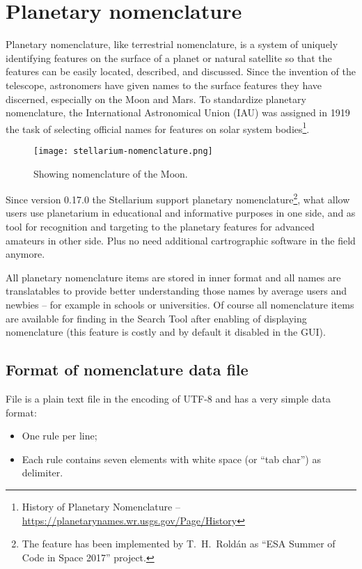 
\chapter{Planetary nomenclature}
\label{ch:Nomenclature}

 Planetary nomenclature, like terrestrial nomenclature, is a system of uniquely identifying features on the surface of a planet or natural satellite so that the features can be easily located, described, and discussed. Since the invention of the telescope, astronomers have given names to the surface features they have discerned, especially on the Moon and Mars. To standardize planetary nomenclature, the International Astronomical Union (IAU) was assigned in 1919 the task of selecting official names for features on solar system bodies\footnote{History of Planetary Nomenclature -- \url{https://planetarynames.wr.usgs.gov/Page/History}}.

\begin{figure}[ht]
\centering\texttt{[image: stellarium-nomenclature.png]}
\caption{Showing nomenclature of the Moon.}
\label{fig:Nomenclature:Moon}
\end{figure}

Since version 0.17.0 the Stellarium support planetary nomenclature\footnote{The feature has been implemented by T.~H.~Roldán as ``ESA Summer of Code in Space 2017'' project.}, what allow users use planetarium in educational and informative purposes in one side, and as tool for recognition and targeting to the planetary features for advanced amateurs in other side. Plus no need additional cartrographic software in the field anymore. 

All planetary nomenclature items are stored in inner format and all names are translatables to provide better understanding those names by average users and newbies -- for example in schools or universities.  Of course all nomenclature items are available for finding in the Search Tool after enabling of displaying nomenclature (this feature is costly and by default it disabled in the GUI).

\section{Format of nomenclature data file}
\label{sec:Nomenclature:format}

File  is a plain text file in the encoding of UTF-8 and has a very simple data format: 
\begin{itemize}
\item One rule per line;
\item Each rule contains seven elements with white space (or ``tab char'') as delimiter.
\end{itemize}

